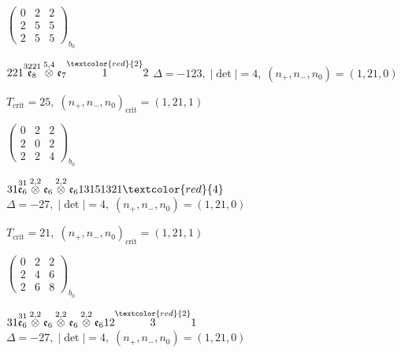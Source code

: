 \documentclass[10pt]{article}
\begin{document}
\hspace{2em}$\left(\begin{smallmatrix}0 & 2 & 2 \\ 2 & 5 & 5 \\ 2 & 5 & 5\end{smallmatrix}\right)_{\!b_0}$

\smallskip

$221\overset{3221}{\mathfrak{e}_8}\overset{5,4}{\otimes}\mathfrak{e}_7\overset{\textcolor{red}{2}}{1}2$ \quad $\Delta=-123,\; |\det|=4,\; (n_+,n_-,n_0)=(1,21,0)$

\hspace{1em}$T_{\text{crit}}=25,\; (n_+,n_-,n_0)_{\text{crit}}=(1,21,1)$

\hspace{2em}$\left(\begin{smallmatrix}0 & 2 & 2 \\ 2 & 0 & 2 \\ 2 & 2 & 4\end{smallmatrix}\right)_{\!b_0}$

\smallskip

$31\overset{31}{\mathfrak{e}_6}\overset{2,2}{\otimes}\mathfrak{e}_6\overset{2,2}{\otimes}\mathfrak{e}_613151321\textcolor{red}{4}$ \quad $\Delta=-27,\; |\det|=4,\; (n_+,n_-,n_0)=(1,21,0)$

\hspace{1em}$T_{\text{crit}}=21,\; (n_+,n_-,n_0)_{\text{crit}}=(1,21,1)$

\hspace{2em}$\left(\begin{smallmatrix}0 & 2 & 2 \\ 2 & 4 & 6 \\ 2 & 6 & 8\end{smallmatrix}\right)_{\!b_0}$

\smallskip

$31\overset{31}{\mathfrak{e}_6}\overset{2,2}{\otimes}\mathfrak{e}_6\overset{2,2}{\otimes}\mathfrak{e}_6\overset{2,2}{\otimes}\mathfrak{e}_612\overset{\textcolor{red}{2}}{3}1$ \quad $\Delta=-27,\; |\det|=4,\; (n_+,n_-,n_0)=(1,21,0)$
\end{document}
